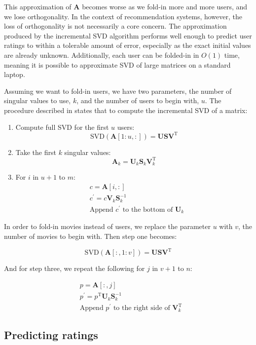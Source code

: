 \documentclass{article} %
\newcommand{\A}{\mathbf{A}}
\newcommand{\T}{\textrm{T}}
\begin{document}
This approximation of $\A$ becomes worse as we fold-in more and more users, and we lose orthogonality.
In the context of recommendation systems, however, the loss of orthogonality is not necessarily a core concern.
The approximation produced by the incremental SVD algorithm performs well enough to predict user ratings to within a tolerable amount of error, especially as the exact initial values are already unknown.
Additionally, each user can be folded-in in $O(1)$ time, meaning it is possible to approximate SVD of large matrices on a standard laptop.

Assuming we want to fold-in users, we have two parameters, the number of singular values to use, $k$, and the number of users to begin with, $u$.
The procedure described in \cite{slides} states that to compute the incremental SVD of a matrix:

\begin{enumerate}
\item Compute full SVD for the first $u$ users:
$$\textrm{SVD}(\A[1:u,:]) = \mathbf{U}\mathbf{S}\mathbf{V}^{\T}$$
\item Take the first $k$ singular values:
$$\A_k= \mathbf{U}_k\mathbf{S}_k\mathbf{V}_k^{\T}$$
\item For $i$ in $u+1$ to $m$:
\begin{align*}
&c = \A[i,:]\\
&c^{\prime} = c \mathbf{V}_k \mathbf{S}_k^{-1}\\
&\textrm{Append $c^{\prime}$ to the bottom of $\mathbf{U}_k$}
\end{align*}
\end{enumerate}

In order to fold-in movies instead of users, we replace the parameter $u$ with $v$, the number of movies to begin with. Then step one becomes:

$$\textrm{SVD}(\A[:,1:v]) = \mathbf{U}\mathbf{S}\mathbf{V}^{\T}$$

And for step three, we repeat the following for $j$ in $v+1$ to $n$:

\begin{align*}
&p = \A[:,j]\\
&p^{\prime} = p^{\T}\mathbf{U}_k\mathbf{S}_k^{-1}\\
&\textrm{Append $p^{\prime}$ to the right side of $\mathbf{V}_k^{\T}$}
\end{align*}

\subsection{Predicting ratings}
\end{document}
